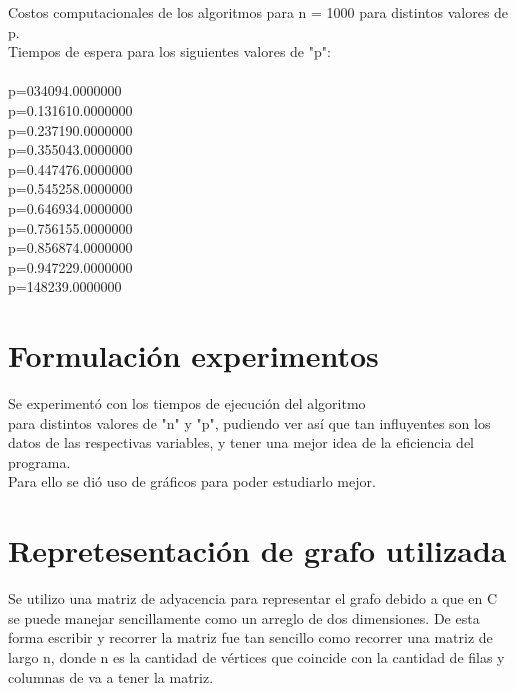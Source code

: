 \documentclass[12pt,letterpaper]{scrartcl}
\begin{document}
Costos computacionales de los algoritmos para n = 1000 para distintos valores de p.
\\
Tiempos de espera para los siguientes valores de "p":
\\\\
p=0\hspace{1cm}34094.0000000
\\
p=0.1\hspace{1cm}31610.0000000
\\
p=0.2\hspace{1cm}37190.0000000
\\
p=0.3\hspace{1cm}55043.0000000
\\
p=0.4\hspace{1cm}47476.0000000
\\
p=0.5\hspace{1cm}45258.0000000
\\
p=0.6\hspace{1cm}46934.0000000
\\
p=0.7\hspace{1cm}56155.0000000
\\
p=0.8\hspace{1cm}56874.0000000
\\
p=0.9\hspace{1cm}47229.0000000
\\
p=1\hspace{1cm}48239.0000000


\newpage
\section{Formulación experimentos}

Se experimentó con los tiempos de ejecución del algoritmo\\ para distintos valores de "n" y "p", pudiendo ver así que tan influyentes son los datos de las respectivas variables, y tener una mejor idea de la eficiencia del programa.
\\
Para ello se dió uso de gráficos para poder estudiarlo mejor.



\section{Repretesentación de grafo utilizada}

Se utilizo una matriz de adyacencia para representar el grafo debido a que en C se puede manejar sencillamente como un arreglo de dos dimensiones. De esta forma escribir y recorrer la matriz fue tan sencillo como recorrer una matriz de largo n, donde n es la cantidad de vértices que coincide con la cantidad de filas y columnas de va a tener la matriz.
\end{document}
